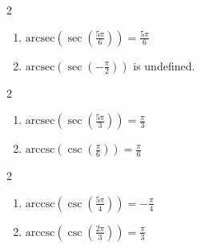 \documentclass{ximera}
\begin{document}
\begin{multicols}{2}

\begin{enumerate}

\setcounter{enumi}{\value{HW}}

\item  $\text{arcsec}\left(\sec\left( \frac{5\pi}{6} \right) \right) = \frac{5\pi}{6}$
\item  $\text{arcsec}\left(\sec\left(-\frac{\pi}{2} \right) \right)$ is undefined. 

\setcounter{HW}{\value{enumi}}

\end{enumerate}

\end{multicols}

\begin{multicols}{2}

\begin{enumerate}

\setcounter{enumi}{\value{HW}}

\item  $\text{arcsec}\left(\sec\left(\frac{5\pi}{3}\right) \right) = \frac{\pi}{3}$
\item  $\text{arccsc}\left(\csc\left(\frac{\pi}{6}\right) \right) = \frac{\pi}{6}$ 

\setcounter{HW}{\value{enumi}}

\end{enumerate}

\end{multicols}

\begin{multicols}{2}

\begin{enumerate}

\setcounter{enumi}{\value{HW}}

\item  $\text{arccsc}\left(\csc\left(\frac{5\pi}{4}\right) \right) = -\frac{\pi}{4}$
\item  $\text{arccsc}\left(\csc\left( \frac{2\pi}{3} \right) \right) = \frac{\pi}{3}$

\setcounter{HW}{\value{enumi}}

\end{enumerate}

\end{multicols}
\end{document}

